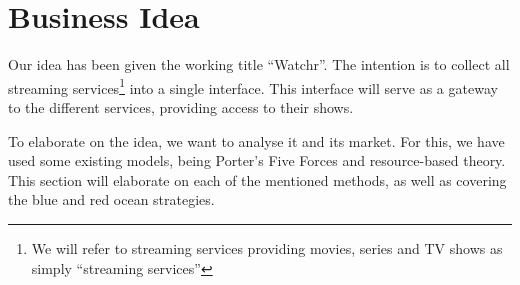 \section{Business Idea}
\label{sec:idea}
Our idea has been given the working title ``Watchr''. The intention is to collect all streaming services\footnote{We will refer to streaming services providing movies, series and TV shows as simply ``streaming services''} into a single interface. This interface will serve as a gateway to the different services, providing access to their shows.

To elaborate on the idea, we want to analyse it and its market. For this, we have used some existing models, being Porter's Five Forces and resource-based theory. This section will elaborate on each of the mentioned methods, as well as covering the blue and red ocean strategies.



